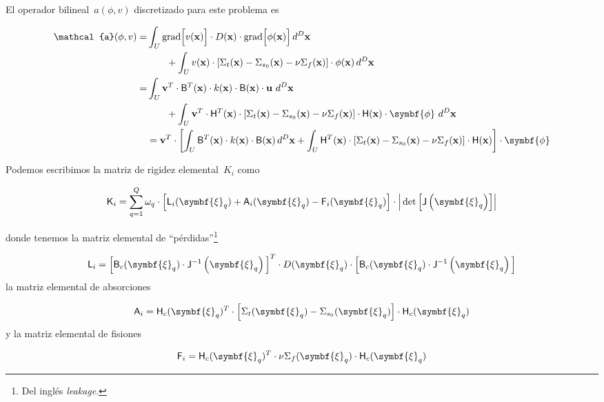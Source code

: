 \documentclass[
  12pt,
  a4paper,
  table]{scrbook}
\theoremstyle{plain}
\theoremstyle{definition}
\theoremstyle{plain}
\theoremstyle{plain}
\theoremstyle{remark}
\begin{document}
El operador bilineal~\(a(\phi,v)\) discretizado para este problema es

\[
\begin{aligned}
\mathcal{a}(\phi,v) =& \int_U \text{grad}\Big[ v(\vec{x}) \Big] \cdot D(\vec{x}) \cdot \text{grad}\Big[ \phi(\vec{x}) \Big] \, d^D \vec{x} \\
& \quad \quad + \int_U v(\vec{x}) \cdot \left[\Sigma_{t}(\vec{x})  - \Sigma_{s_0}(\vec{x}) - \nu\Sigma_{f}(\vec{x}) \right] \cdot \phi(\vec{x}) \,d^D\vec{x} \\
=& \int_U \vec{v}^T \cdot \mat{B}^T(\vec{x}) \cdot k(\vec{x}) \cdot \mat{B}(\vec{x}) \cdot \vec{u} \,\, d^D\vec{x}  \\
& \quad \quad + \int_U \vec{v}^T \cdot \mat{H}^T(\vec{x}) \cdot \left[\Sigma_{t}(\vec{x})  - \Sigma_{s_0}(\vec{x}) - \nu\Sigma_{f}(\vec{x}) \right] \cdot \mat{H}(\vec{x}) \cdot \symbf{\phi} \,\, d^D\vec{x} \\
&= \vec{v}^T \cdot \left[ \int_U \mat{B}^T(\vec{x}) \cdot k(\vec{x}) \cdot \mat{B}(\vec{x}) \, d^D\vec{x}
+ \int_U \mat{H}^T(\vec{x}) \cdot \left[\Sigma_{t}(\vec{x})  - \Sigma_{s_0}(\vec{x}) - \nu\Sigma_{f}(\vec{x}) \right] \cdot \mat{H}(\vec{x})
\right] \cdot \symbf{\phi} \\
\end{aligned}
\]

Podemos escribimos la matriz de rigidez elemental~\(K_i\) como

\[
\mat{K}_i = 
\sum_{q=1}^Q \omega_q \cdot \left[ \mat{L}_i(\symbf{\xi}_q) + \mat{A}_i(\symbf{\xi}_q) - \mat{F}_i(\symbf{\xi}_q)\right] \cdot \Big|\det{\left[\mat{J}\left(\symbf{\xi}_q\right)\right]}\Big|
\]

donde tenemos la matriz elemental de ``pérdidas''\footnote{Del inglés
  \foreignlanguage{american}{\emph{leakage}}.}

\[
\mat{L}_i = \Big[ \mat{B}_c(\symbf{\xi}_q) \cdot \mat{J}^{-1}\left(\symbf{\xi}_q\right) \Big]^T \cdot D(\symbf{\xi}_q) \cdot \Big[ \mat{B}_c(\symbf{\xi}_q) \cdot \mat{J}^{-1}\left(\symbf{\xi}_q\right) \Big]
\] la matriz elemental de absorciones

\[
\mat{A}_i = \mat{H}_c(\symbf{\xi}_q)^T \cdot \left[ \Sigma_t(\symbf{\xi}_q) - \Sigma_{s_0} (\symbf{\xi}_q) \right] \cdot \mat{H}_c(\symbf{\xi}_q)
\] y la matriz elemental de fisiones

\[
\mat{F}_i = \mat{H}_c(\symbf{\xi}_q)^T \cdot \nu\Sigma_f(\symbf{\xi}_q) \cdot \mat{H}_c(\symbf{\xi}_q)
\]
\end{document}
